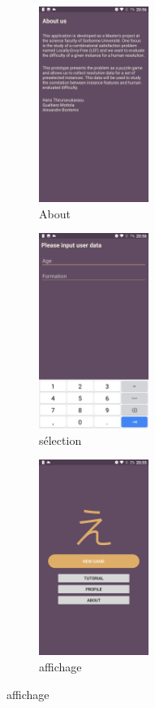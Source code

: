 \documentclass[a4paper, 10pt]{article}
\begin{document}
\begin{figure}[h!]
    \centering
    \begin{subfigure}{0.23\textwidth}
        \centering
        \includegraphics[height=2.5in]{abou}
        \caption{About}
    \end{subfigure}
    \begin{subfigure}{0.23\textwidth}
        \centering
        \includegraphics[height=2.5in]{infor}
        \caption{sélection}
    \end{subfigure}%
    \begin{subfigure}{0.23\textwidth}
        \centering
        \includegraphics[height=2.5in]{main}
        \caption{affichage}
    \end{subfigure}%

\end{figure}
\end{document}
